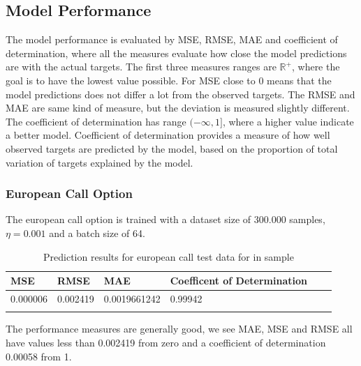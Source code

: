 \subsection{Model Performance}
The model performance is evaluated by MSE, RMSE, MAE and coefficient of determination, where all the measures evaluate how close the model predictions are with the actual targets. The first three measures ranges are $\mathbb{R}^+$, where the goal is to have the lowest value possible. For MSE close to 0 means that the model predictions does not differ a lot from the observed targets. The RMSE and MAE are same kind of measure, but the deviation is measured slightly different. The coefficient of determination has range $(-\infty, 1]$, where a higher value indicate a better model. Coefficient of determination provides a measure of how well observed targets are predicted by the model, based on the proportion of total variation of targets explained by the model.

\subsubsection{European Call Option}
The european call option is trained with a dataset size of 300.000 samples, $\eta=0.001$ and a batch size of 64. 

\begin{table}[th]
\caption{Prediction results for european call test data for in sample}
\label{tab:euroParRange}
\centering
\begin{tabular}{l l l l l l }
\toprule
\textbf{MSE} & \textbf{RMSE} & \textbf{MAE} & \textbf{Coefficent of Determination} \\
\midrule
0.000006 & 0.002419 & 0.0019661242 & 0.99942\\
\bottomrule\\
\end{tabular}
\end{table}



The performance measures are generally good, we see MAE, MSE and RMSE all have values less than 0.002419 from zero and a coefficient of determination 0.00058 from 1. 

